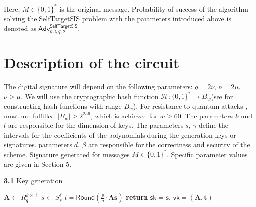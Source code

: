 \documentclass{article}
\theoremstyle{plain}
\theoremstyle{definition}
\begin{document}
    Here, $M \in \{0, 1\}^*$ is the original message. Probability of success of the algorithm solving the SelfTargetSIS problem with the parameters introduced above is denoted as $\mathsf{Adv}^{\mathsf{SelfTargetSIS}}_{k, l, q, b}$.
    \newline

    \section{Description of the circuit}
    \label{sec:desc_of_circuit}
    The digital signature will depend on the following parameters: $q = 2\nu$, $p = 2\mu$, $\nu > \mu$. We will use the cryptographic hash function $\mathcal{H}: \{0, 1\}^* \rightarrow B_w$(see \cite{DKL+18} for constructing hash functions with range $B_w$). For resistance to quantum attacks \cite{BHMT02}, must are fulfilled $|B_w| \geq 2^{256}$, which is achieved for $w \geq 60$. The parameters $k$ and $l$ are responsible for the dimension of keys. The parameters $s$, $\gamma$ define the intervals for the coefficients of the polynomials during the generation keys or signatures, parameters $d$, $\beta$ are responsible for the correctness and security of the scheme. Signature generated for messages $M \in \{0, 1\}^*$. Specific parameter values are given in Section 5.

    \begin{algorithm}
    \renewcommand{\thealgorithm}{}
    \caption{\textbf{3.1} Key generation}
    \begin{algorithmic}[1]
        \Statex{}
        \State $\mathbf{A} \gets R^{k \times \ell}_q$
        \State $s \gets S^{\ell}_{s}$
        \State $t = \mathsf{Round}(\frac{p}{q}\cdot \mathbf{As})$ 
        \State \textbf{return} $\mathsf{sk} = \mathbf{s}$, $\mathsf{vk} = (\mathbf{A}, \mathbf{t}) $ 
    \end{algorithmic}
    \end{algorithm}
\end{document}
